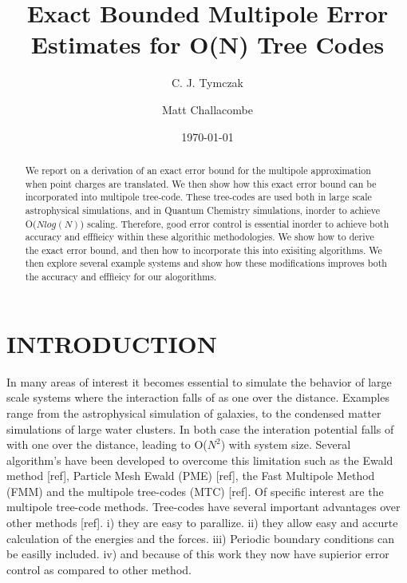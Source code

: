 \documentclass[prb,aps,nobibnotes,superbib,preprint]{revtex4}
\begin{document}
\title{\textbf{Exact Bounded Multipole Error Estimates for O(N) Tree Codes}}

\author{C. J. Tymczak}
\author{Matt Challacombe}


\date{\today}

\begin{abstract}
We report on a derivation of an exact error bound for the multipole approximation when point 
charges are translated. We then show how this exact error bound can be incorporated into
multipole tree-code. These tree-codes are used both in large scale astrophysical 
simulations, and in Quantum Chemistry simulations, inorder to achieve {\cal O}($N log(N)$) 
scaling. Therefore, good error control is essential inorder to achieve both 
accuracy and efffieicy within these algorithic methodologies. We show how to derive the
exact error bound, and then how to incorporate this into exisiting algorithms. We then explore 
several example systems and show how these modifications improves both the accuracy and efffieicy 
for our alogorithms.
\end{abstract}


\maketitle

\section{INTRODUCTION}

In many areas of interest it becomes essential to simulate 
the behavior of large scale systems where the interaction 
falls of as one over the distance. Examples range from  the astrophysical simulation
of galaxies, to the condensed matter simulations of large water clusters. 
In both case the interation potential falls of with one over the distance, 
leading to  {\cal O}($N^2$) with system size. Several algorithm's have been developed to
overcome this limitation such as the Ewald method [ref], Particle Mesh Ewald (PME) [ref], the
Fast Multipole Method (FMM) and the multipole tree-codes (MTC) [ref]. 
Of specific interest are the multipole tree-code methods. 
Tree-codes have several important advantages over other methods [ref]. i) they are easy to parallize.
ii) they allow easy and accurte calculation of the energies and the forces. iii) Periodic boundary
conditions can be easilly included. iv) and because of this work they
now have supierior error control as compared to other method.
\end{document}
